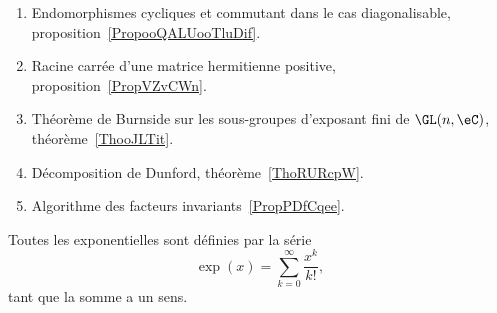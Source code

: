     \begin{enumerate}
    \item Endomorphismes cycliques et commutant dans le cas diagonalisable, proposition~\ref{PropooQALUooTluDif}.
    \item Racine carrée d'une matrice hermitienne positive, proposition~\ref{PropVZvCWn}.
    \item Théorème de Burnside sur les sous-groupes d'exposant fini de \( \GL(n,\eC)\), théorème~\ref{ThooJLTit}.
    \item Décomposition de Dunford, théorème~\ref{ThoRURcpW}.
    \item Algorithme des facteurs invariants~\ref{PropPDfCqee}.
    \end{enumerate}

        \label{THEMEooKXSGooCsQNoY}

Toutes les exponentielles sont définies par la série
\begin{equation*}
    \exp(x)=\sum_{k=0}^{\infty}\frac{ x^k }{ k! },
\end{equation*}
tant que la somme a un sens.

